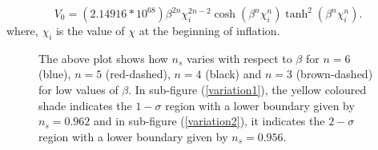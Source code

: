 \documentclass[prd,twocolumn,superscriptaddress]{revtex4}
\begin{document}
\begin{equation}
V_0 = \left( 2.14916 *10^{68} \right) \beta^{2n} \chi_i^{2n - 2}
\cosh \left( \beta^n \chi_i^n \right) \tanh^2 \left( \beta^n \chi_i^n \right).
 \end{equation}
 where, $\chi_i$ is the value of $\chi$ at the beginning of inflation.
%   
 \begin{figure}[]
\begin{minipage}{.7\linewidth}
\centering
{}
\end{minipage}\par\medskip
\begin{minipage}{.7\linewidth}
\centering
{}
\end{minipage}

\caption{The above plot shows how $n_s$ varies with respect to $\beta$ for $n = 6$ (blue), $n = 5$ (red-dashed), $n = 4$ (black)
 and $n = 3$ (brown-dashed) for low values of $\beta$. In sub-figure (\ref{variation1}), the yellow
 coloured shade indicates the $1-\sigma$ region with a lower boundary given by $n_s =0.962 $ and in sub-figure
 (\ref{variation2}), it indicates the $2-\sigma$ region with a lower boundary given by $n_s =0.956 $.}
  \label{lowbeta}
\end{figure}
 
\end{document}
